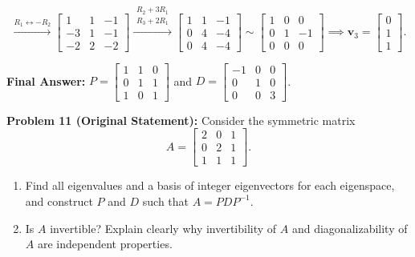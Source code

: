 \documentclass[11pt, letterpaper]{article}
\theoremstyle{definition}
\theoremstyle{remark}
\begin{document}
\begin{itemize}
\[    \xrightarrow{R_{1} \leftrightarrow -R_{2}}
    \begin{bmatrix} 1 & 1 & -1 \\ -3 & 1 & -1 \\ -2 & 2 & -2 \end{bmatrix}
    \xrightarrow{\substack{R_{2} + 3R_{1} \\ R_{3} + 2R_{1}}}
    \begin{bmatrix} 1 & 1 & -1 \\ 0 & 4 & -4 \\ 0 & 4 & -4 \end{bmatrix}
    \sim
    \begin{bmatrix} 1 & 0 & 0 \\ 0 & 1 & -1 \\ 0 & 0 & 0 \end{bmatrix}
    \implies \mathbf{v}_{3} = \begin{bmatrix} 0 \\ 1 \\ 1 \end{bmatrix}.
    \]
\end{itemize}
\textbf{Final Answer:} $P = \begin{bmatrix} 1 & 1 & 0 \\ 0 & 1 & 1 \\ 1 & 0 & 1 \end{bmatrix}$ and $D = \begin{bmatrix} -1 & 0 & 0 \\ 0 & 1 & 0 \\ 0 & 0 & 3 \end{bmatrix}$.

\vspace{0.8em}
\textbf{Problem 11 (Original Statement):}
Consider the symmetric matrix
\[
A = \begin{bmatrix} 2 & 0 & 1 \\ 0 & 2 & 1 \\ 1 & 1 & 1 \end{bmatrix}.
\]
\begin{enumerate}[label=(\alph*)]
    \item Find all eigenvalues and a basis of integer eigenvectors for each eigenspace, and construct $P$ and $D$ such that $A = PDP^{-1}$.
    \item Is $A$ invertible? Explain clearly why invertibility of $A$ and diagonalizability of $A$ are independent properties.
\end{enumerate}
\end{document}

